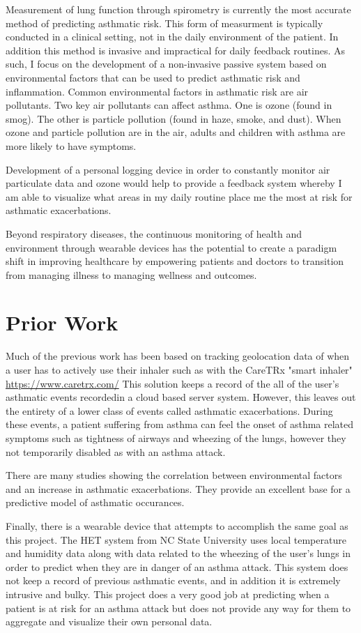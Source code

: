 \documentclass{sigchi}
\begin{document}
Measurement of lung function through spirometry is currently the most accurate
method of predicting asthmatic risk. This form of measurment is typically
conducted in a clinical setting, not in the daily environment of the patient.
In addition this method is invasive and impractical for daily feedback routines.
As such, I focus on the development of a non-invasive passive system based on
environmental factors that can be used to predict asthmatic risk and inflammation.
Common environmental factors in asthmatic risk are air pollutants. Two key air
pollutants can affect asthma. One is ozone (found in smog). The other is
particle pollution (found in haze, smoke, and dust). When ozone and particle
pollution are in the air, adults and children with asthma are more likely to
have symptoms. \cite{asthma:flyer}

Development of a personal logging device in order to constantly monitor air
particulate data and ozone would help to provide a feedback system whereby I am
able to visualize what areas in my daily routine place me the most at risk for
asthmatic exacerbations.

Beyond respiratory diseases, the continuous monitoring of health and environment
through wearable devices has the potential to create a paradigm shift in
improving healthcare by empowering patients and doctors to transition from
managing illness to managing wellness and outcomes.

\section{Prior Work}
Much of the previous work has been based on tracking geolocation data of when a
user has to actively use their inhaler such as with the CareTRx "smart inhaler"
\url{https://www.caretrx.com/} This solution keeps a record of the all of the
user's asthmatic events recordedin a cloud based server system. \cite{caretrx} However, this
leaves out the entirety of a lower class of events called asthmatic exacerbations. During these
events, a patient suffering from asthma can feel the onset of asthma related
symptoms such as tightness of airways and wheezing of the lungs, however they
not temporarily disabled as with an asthma attack.

There are many studies showing the correlation between environmental factors and
an increase in asthmatic exacerbations. \cite{farr_2016, weber} They provide an
excellent base for a predictive model of asthmatic occurances.

Finally, there is a wearable device that attempts to accomplish the same goal as
this project. The HET system from NC State University uses local temperature
and humidity data along with data related to the wheezing of the user's lungs
in order to predict when they are in danger of an asthma attack.
This system does not keep a record of previous asthmatic events, and in
addition it is extremely intrusive and bulky. \cite{lowpower} This project does
a very good job at predicting when a patient is at risk for an asthma attack but
does not provide any way for them to aggregate and visualize their own personal
data.
\end{document}
